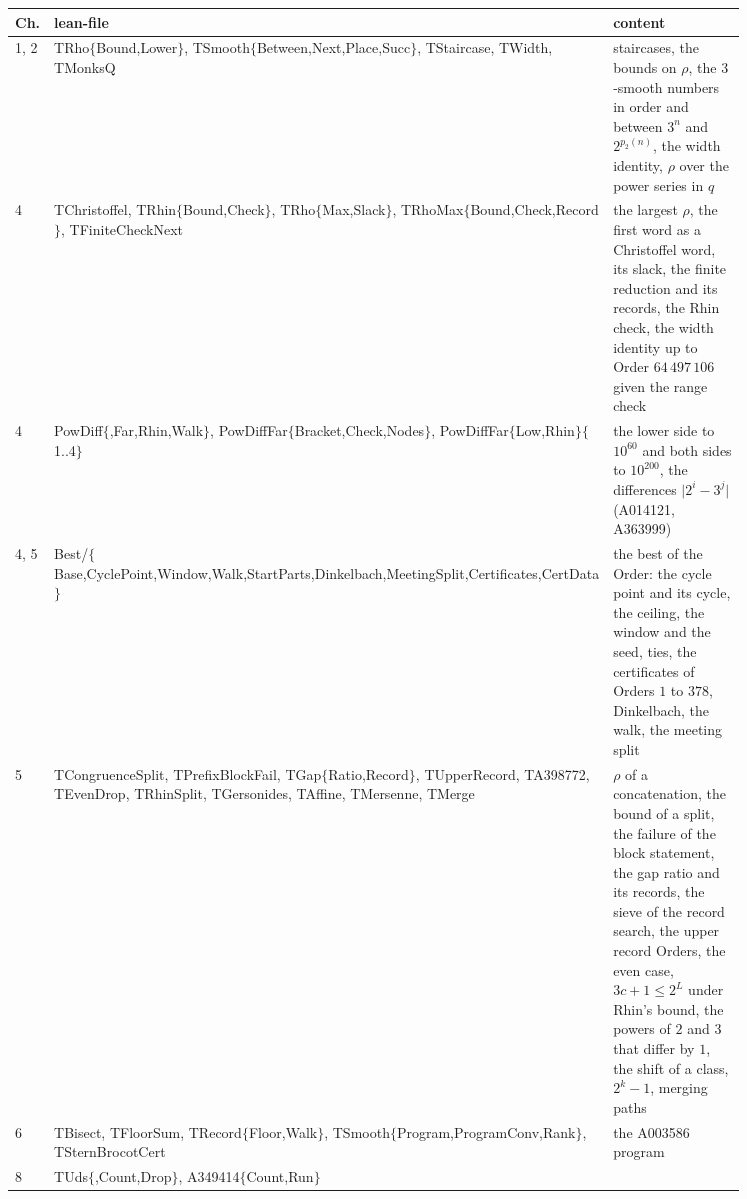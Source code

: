 \documentclass[10pt,a4paper,titlepage]{article}
\newcommand{\lean}[1]{\textsf{#1}}
\begin{document}
\begin{table}[htbp]
\centering
\footnotesize
\begin{tabular}{@{}l>{\raggedright\arraybackslash}p{0.40\linewidth}>{\raggedright\arraybackslash}p{0.45\linewidth}@{}}
\toprule
Ch. & lean-file & content \\
\midrule
1, 2 & \lean{TRho$\{$Bound,Lower$\}$}, \lean{TSmooth$\{$Between,Next,Place,Succ$\}$},
  \lean{TStaircase}, \lean{TWidth}, \lean{TMonksQ}
  & staircases, the bounds on $\rho$, the $3$-smooth numbers in order and between $3^n$
  and $2^{p_2(n)}$, the width identity, $\rho$ over the power series in $q$ \\
4 & \lean{TChristoffel}, \lean{TRhin$\{$Bound,Check$\}$}, \lean{TRho$\{$Max,Slack$\}$},
  \lean{TRhoMax$\{$Bound,Check,Record$\}$}, \lean{TFiniteCheckNext}
  & the largest $\rho$, the first word as a Christoffel word, its slack, the finite
  reduction and its records, the Rhin check, the width identity up to Order $64\,497\,106$ given the range check \\
4 & \lean{PowDiff$\{$,Far,Rhin,Walk$\}$},
  \lean{PowDiffFar$\{$Bracket,Check,Nodes$\}$},
  \lean{PowDiffFar$\{$Low,Rhin$\}\{$1..4$\}$}
  & the lower side to $10^{60}$ and both sides to $10^{200}$, the differences $\lvert 2^i - 3^j \rvert$ (A014121, A363999) \\
4, 5 & \lean{Best/$\{$Base,CyclePoint,\allowbreak Window,Walk,StartParts,\allowbreak Dinkelbach,MeetingSplit,\allowbreak Certificates,CertData$\}$}
  & the best of the Order: the cycle point and its cycle, the ceiling, the window and the seed, ties, the certificates of Orders $1$ to $378$, Dinkelbach, the walk, the meeting split \\
5 & \lean{TCongruenceSplit}, \lean{TPrefixBlockFail}, \lean{TGap$\{$Ratio,Record$\}$},
  \lean{TUpperRecord}, \lean{TA398772}, \lean{TEvenDrop}, \lean{TRhinSplit}, \lean{TGersonides}, \lean{TAffine}, \lean{TMersenne}, \lean{TMerge}
  & $\rho$ of a concatenation, the bound of a split, the failure of the block statement, the gap ratio and its
  records, the sieve of the record search, the upper record Orders, the even case, $3c + 1 \le 2^L$ under Rhin's bound, the powers of $2$ and $3$ that differ by $1$, the shift of a class, $2^k - 1$, merging paths \\
6 & \lean{TBisect}, \lean{TFloorSum}, \lean{TRecord$\{$Floor,Walk$\}$},
  \lean{TSmooth$\{$Program,ProgramConv,Rank$\}$}, \lean{TSternBrocotCert}
  & the A003586 program \\
8 & \lean{TUds$\{$,Count,Drop$\}$}, \lean{A349414$\{$Count,Run$\}$}

\end{tabular}
\end{table}
\end{document}
